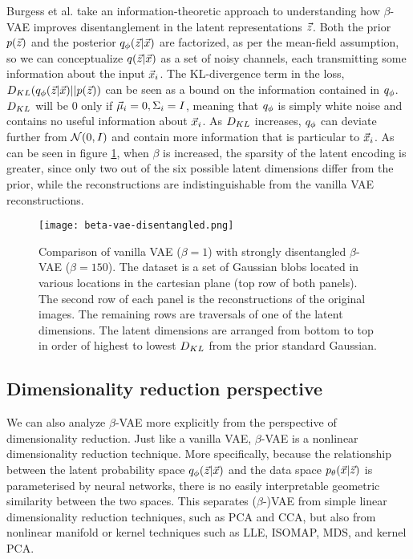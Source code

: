 Burgess et al. \cite{burgess2018understanding} take an information-theoretic approach to understanding how $\beta$-VAE improves disentanglement in the latent representations $\vec{z}$. Both the prior $p(\vec{z})$ and the posterior $q_\phi(\vec{z}|\vec{x})$ are factorized, as per the mean-field assumption, so we can conceptualize $q(\vec{z}|\vec{x})$ as a set of noisy channels, each transmitting some information about the input $\vec{x}_i$. The KL-divergence term in the loss, $D_{KL}(q_\phi(\vec{z}|\vec{x})||p(\vec{z}))$ can be seen as a bound on the information contained in $q_\phi$. $D_{KL}$ will be 0 only if $\vec{\mu}_i = 0, \Sigma_i = I$, meaning that $q_\phi$ is simply white noise and contains no useful information about $\vec{x}_i$. As $D_{KL}$ increases, $q_\phi$ can deviate further from $\mathcal{N}(0, I)$ and contain more information that is particular to $\vec{x}_i$. As can be seen in figure \ref{fig:beta-vae-disentagled}, when $\beta$ is increased, the sparsity of the latent encoding is greater, since only two out of the six possible latent dimensions differ from the prior, while the reconstructions are indistinguishable from the vanilla VAE reconstructions.

\begin{figure}
    \label{fig:beta-vae-disentagled}
    \texttt{[image: beta-vae-disentangled.png]}
    \caption{Comparison of vanilla VAE ($\beta=1$) with strongly disentangled $\beta$-VAE ($\beta=150$). The dataset is a set of Gaussian blobs located in various locations in the cartesian plane (top row of both panels). The second row of each panel is the reconstructions of the original images. The remaining rows are traversals of one of the latent dimensions. The latent dimensions are arranged from bottom to top in order of highest to lowest $D_{KL}$ from the prior standard Gaussian.}
\end{figure}

\subsection{Dimensionality reduction perspective}

We can also analyze $\beta$-VAE more explicitly from the perspective of dimensionality reduction. Just like a vanilla VAE, $\beta$-VAE is a nonlinear dimensionality reduction technique. More specifically, because the relationship between the latent probability space $q_\phi(\vec{z}|\vec{x})$ and the data space $p_\theta(\vec{x}|\vec{z})$ is parameterised by neural networks, there is no easily interpretable geometric similarity between the two spaces. This separates ($\beta$-)VAE from simple linear dimensionality reduction techniques, such as PCA and CCA, but also from nonlinear manifold or kernel techniques such as LLE, ISOMAP, MDS, and kernel PCA.

